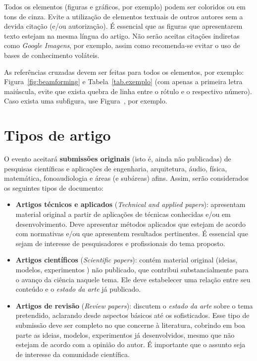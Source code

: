 Todos os elementos (figuras e gráficos, por exemplo) podem ser coloridos ou em tons de cinza. Evite a utilização de elementos textuais de outros autores sem a devida citação (e/ou autorização). É essencial que as figuras que apresentarem texto estejam na mesma língua do artigo. Não serão aceitas citações indiretas como \textit{Google Imagens}, por exemplo, assim como recomenda-se evitar o uso de bases de conhecimento voláteis.

\enlargethispage{2mm}

As referências cruzadas devem ser feitas para todos os elementos, por exemplo: Figura~\ref{fig:beamforming} e Tabela~\ref{tab.exemplo} (com apenas a primeira letra maiúscula, evite que exista quebra de linha entre o rótulo e o respectivo número). Caso exista uma subfigura, use Figura~, por exemplo.


\section{Tipos de artigo}

O evento aceitará \textbf{submissões originais} (isto é, ainda não publicadas) de pesquisas científicas e aplicações de engenharia, arquitetura, áudio, física, matemática, fonoaudiologia e áreas (e subáreas) afins. Assim, serão considerados os seguintes tipos de documento:
%
\begin{itemize}[noitemsep,topsep=0ex] \itemsep=7pt
	\item \textbf{Artigos técnicos e aplicados} (\textit{Technical and applied papers}):
	apresentam material original a partir de aplicações de técnicas conhecidas e/ou em desenvolvimento. Deve apresentar métodos aplicados que estejam de acordo com normativas e/ou que apresentem resultados pertinentes. É essencial que sejam de interesse de pesquisadores e profissionais do tema proposto.
	
	\item \textbf{Artigos científicos} (\textit{Scientific papers}): 
	contém material original (ideias, modelos, experimentos \etc) não publicado, que contribui substancialmente para o avanço da ciência naquele tema. Ele deve estabelecer uma relação entre seu conteúdo e o \textit{estado da arte} já publicado. 

	\item \textbf{Artigos de revisão} (\textit{Review papers}):
	discutem o \textit{estado da arte} sobre o tema pretendido, aclarando desde aspectos básicos até os sofisticados. Esse tipo de submissão deve ser completo no que concerne à literatura, cobrindo em boa parte as ideias, modelos, experimentos \etc já desenvolvidos, mesmo que não estejam de acordo com a opinião do autor. É importante que o assunto seja de interesse da comunidade científica.	
\end{itemize}

